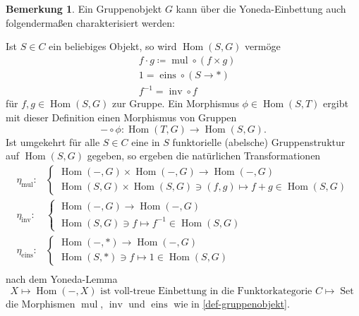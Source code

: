 \documentclass{amsart}
\theoremstyle{plain}
\theoremstyle{definition}
\newtheorem{remark}[subsection]{Bemerkung}
\renewcommand{\hom}{\operatorname{Hom}}
\begin{document}
\begin{remark}
	Ein Gruppenobjekt $G$ kann über die Yoneda-Einbettung auch folgendermaßen charakterisiert werden:

	\noindent Ist $S \in C$ ein beliebiges Objekt, so wird $\hom(S, G)$ vermöge
	\begin{align*}
		& f \cdot g \coloneqq \operatorname{mul} \circ (f \times g) \\
		& 1 = \operatorname{eins} \circ (S \rightarrow *) \\
		& f^{-1} = \operatorname{inv} \circ f
	\end{align*}
	für $f, g \in \hom(S, G)$ zur Gruppe. Ein Morphismus $\phi \in \hom(S, T)$ ergibt mit dieser Definition einen Morphismus von Gruppen
	\begin{equation*}
		- \circ \phi \colon \hom(T, G) \rightarrow \hom(S, G).
	\end{equation*}
	Ist umgekehrt für alle $S \in C$ eine in $S$ funktorielle (abelsche) Gruppenstruktur auf $\hom(S, G)$ gegeben, so ergeben die natürlichen Transformationen
	\begin{align*}
		\eta_{\operatorname{mul}} \colon &
		\begin{cases}
			\hom(-, G) \times \hom(-, G) \rightarrow \hom(-, G) \\
			\hom(S, G) \times \hom(S, G) \ni (f, g) \mapsto f + g \in \hom(S, G)
		\end{cases} \\
		\eta_{\operatorname{inv}} \colon &
		\begin{cases}
			\hom(-, G) \rightarrow \hom(-, G) \\
			\hom(S, G) \ni f \mapsto f^{-1} \in \hom(S, G)
		\end{cases} \\
		\eta_{\operatorname{eins}} \colon &
		\begin{cases}
			\hom(-, *) \rightarrow \hom(-, G) \\
			\hom(S, *) \ni f \mapsto 1 \in \hom(S, G)
		\end{cases} \\
	\end{align*}
	nach dem Yoneda-Lemma 
	\begin{equation*}
		X \mapsto \hom(-, X) \text{ ist voll-treue Einbettung in die Funktorkategorie } C \mapsto \operatorname{Set}
	\end{equation*}
	 die Morphismen $\operatorname{mul}$, $\operatorname{inv}$ und $\operatorname{eins}$ wie in \ref{def-gruppenobjekt}.
\end{remark}
\end{document}
